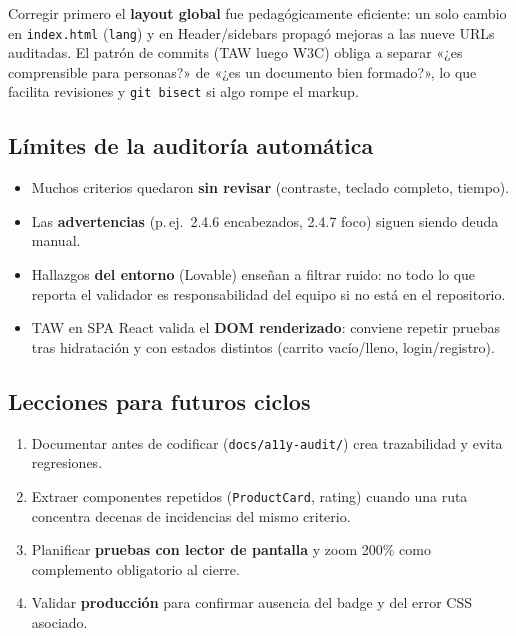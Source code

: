 \documentclass[11pt,a4paper]{article}
\begin{document}
Corregir primero el \textbf{layout global} fue pedagógicamente eficiente: un solo cambio en \texttt{index.html} (\texttt{lang}) y en Header/sidebars propagó mejoras a las nueve URLs auditadas. El patrón de commits (TAW luego W3C) obliga a separar «¿es comprensible para personas?» de «¿es un documento bien formado?», lo que facilita revisiones y \texttt{git bisect} si algo rompe el markup.

\subsection{Límites de la auditoría automática}

\begin{itemize}[noitemsep]
  \item Muchos criterios quedaron \textbf{sin revisar} (contraste, teclado completo, tiempo).
  \item Las \textbf{advertencias} (p.\,ej.\ 2.4.6 encabezados, 2.4.7 foco) siguen siendo deuda manual.
  \item Hallazgos \textbf{del entorno} (Lovable) enseñan a filtrar ruido: no todo lo que reporta el validador es responsabilidad del equipo si no está en el repositorio.
  \item TAW en SPA React valida el \textbf{DOM renderizado}: conviene repetir pruebas tras hidratación y con estados distintos (carrito vacío/lleno, login/registro).
\end{itemize}

\subsection{Lecciones para futuros ciclos}

\begin{enumerate}[noitemsep]
  \item Documentar antes de codificar (\texttt{docs/a11y-audit/}) crea trazabilidad y evita regresiones.
  \item Extraer componentes repetidos (\texttt{ProductCard}, rating) cuando una ruta concentra decenas de incidencias del mismo criterio.
  \item Planificar \textbf{pruebas con lector de pantalla} y zoom 200\% como complemento obligatorio al cierre.
  \item Validar \textbf{producción} para confirmar ausencia del badge y del error CSS asociado.
\end{enumerate}

\end{document}
